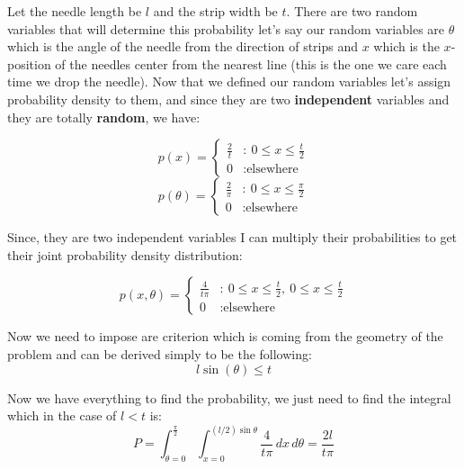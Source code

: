 \documentclass[12pt,letterpaper]{article}
\begin{document}
Let the needle length be $l$ and the strip width be $t$. There are two random variables that will determine this probability let's say our random variables are $\theta$ which is the angle of the needle from the direction of strips and $x$ which is the $x$-position of the needles center from the nearest line (this is the one we care each time we drop the needle). Now that we defined our random variables let's assign probability density to them, and since they are two \textbf{independent} variables and they are totally \textbf{random}, we have: 


\begin{multicols}{2}
\noindent
\begin{equation*}
 p(x) = \begin{cases}
 \frac{2}{t} &:\ 0 \le x \le \frac{t}{2}\\
 0 &: \text{elsewhere}
 \end{cases}
\end{equation*}
\begin{equation*}
p(\theta)=
\begin{cases}
\frac{2}{\pi} &:\ 0 \le x \le \frac{\pi}{2}\\
0 &: \text{elsewhere}
\end{cases}
\end{equation*}
\end{multicols}

Since, they are two independent variables I can multiply their probabilities to get their joint probability density distribution: 

\begin{equation*}
p(x,\theta)=
\begin{cases}
\frac{4}{t\pi} &:\ 0 \le x \le \frac{t}{2} , \ 0 \le x \le \frac{t}{2}\\
 0 &: \text{elsewhere}
\end{cases}
\end{equation*}

Now we need to impose are criterion which is coming from the geometry of the problem and can be derived simply to be the following:
\begin{equation*}
l \sin(\theta) \leq t
\end{equation*}

Now we have everything to find the probability, we just need to find the integral which in the case of $l<t$ is:
\begin{equation*}
 P=\int _{\theta =0}^{\frac {\pi }{2}}\int _{x=0}^{(l/2)\sin \theta }{\frac {4}{t\pi }}\,dx\,d\theta ={\frac {2l}{t\pi }}
\end{equation*}
\end{document}
